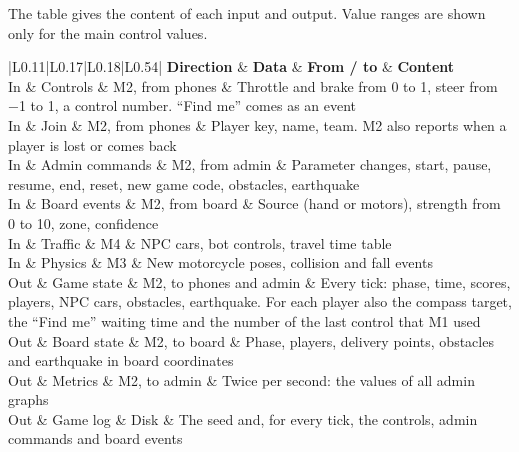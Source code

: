 \documentclass[
  english,
  10pt,
  a4paper,
]{article}
\newcommand{\ckkeep}[1]{\par\noindent\begin{minipage}{\linewidth}\setlength{\parskip}{4pt}#1\end{minipage}\par\smallskip}
\begin{document}
\ckkeep{%
The table gives the content of each input and output. Value ranges are shown only for the main
control values.

\begin{tabular}{|L{0.11}|L{0.17}|L{0.18}|L{0.54}|}
\hline \textbf{Direction} & \textbf{Data} & \textbf{From / to} & \textbf{Content} \\ \hline 
In & Controls & M2, from phones & Throttle and brake from 0 to 1, steer from −1 to 1, a control number. ``Find me'' comes as an event \\ \hline
In & Join & M2, from phones & Player key, name, team. M2 also reports when a player is lost or comes back \\ \hline
In & Admin commands & M2, from admin & Parameter changes, start, pause, resume, end, reset, new game code, obstacles, earthquake \\ \hline
In & Board events & M2, from board & Source (hand or motors), strength from 0 to 10, zone, confidence \\ \hline
In & Traffic & M4 & NPC cars, bot controls, travel time table \\ \hline
In & Physics & M3 & New motorcycle poses, collision and fall events \\ \hline
Out & Game state & M2, to phones and admin & Every tick: phase, time, scores, players, NPC cars, obstacles, earthquake. For each player also the compass target, the ``Find me'' waiting time and the number of the last control that M1 used \\ \hline
Out & Board state & M2, to board & Phase, players, delivery points, obstacles and earthquake in board coordinates \\ \hline
Out & Metrics & M2, to admin & Twice per second: the values of all admin graphs \\ \hline
Out & Game log & Disk & The seed and, for every tick, the controls, admin commands and board events \\ \hline
\end{tabular}}

\end{document}
